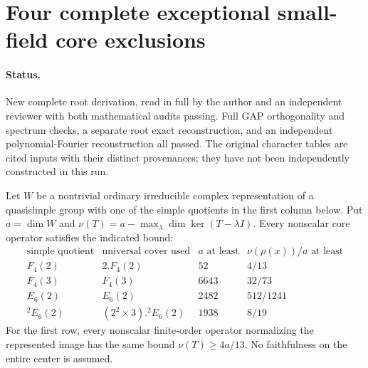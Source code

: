 \section{Four complete exceptional small-field core exclusions}
\label{sec:exceptional-small-cores}

\paragraph{Status.}
New complete root derivation, read in full by the author and an
independent reviewer with both mathematical audits passing. Full GAP
orthogonality and spectrum checks, a separate root exact reconstruction,
and an independent polynomial-Fourier reconstruction all passed.
The original character tables are cited inputs with their distinct
provenances; they have not been independently constructed in this run.

\begin{lemma}
\label{D-EXS-01}
Let $W$ be a nontrivial ordinary irreducible complex representation of a
quasisimple group with one of the simple quotients in the first column
below. Put $a=\dim W$ and
$\nu(T)=a-\max_\lambda\dim\ker(T-\lambda I)$. Every nonscalar core
operator satisfies the indicated bound:
\[
\begin{array}{c|c|c|c}
\text{simple quotient}&\text{universal cover used}&a\text{ at least}
                                      &\nu(\rho(x))/a\text{ at least}\\\hline
F_4(2)&2.F_4(2)&52&4/13\\
F_4(3)&F_4(3)&6643&32/73\\
E_6(2)&E_6(2)&2482&512/1241\\
{}^2E_6(2)&(2^2\times3).{}^2E_6(2)&1938&8/19
\end{array}                                                    \tag{EXS.1}
\]
For the first row, every nonscalar finite-order operator normalizing
the represented image has the same bound $\nu(T)\ge4a/13$.
No faithfulness on the entire center is assumed.
\end{lemma}

